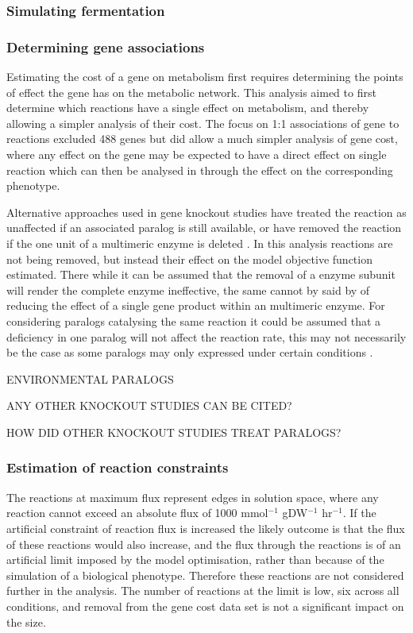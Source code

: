 \subsubsection{Simulating fermentation}

\subsubsection{Determining gene associations}

Estimating the cost of a gene on metabolism first requires determining the points of effect the gene has on the metabolic network. This analysis aimed to first determine which reactions have a single effect on metabolism, and thereby allowing a simpler analysis of their cost. The focus on 1:1 associations of gene to reactions excluded 488 genes but did allow a much simpler analysis of gene cost, where any effect on the gene may be expected to have a direct effect on single reaction which can then be analysed in through the effect on the corresponding phenotype.

Alternative approaches used in gene knockout studies have treated the reaction as unaffected if an associated paralog is still available, or have removed the reaction if the one unit of a multimeric enzyme is deleted \cite{pal2006}. In this analysis reactions are not being removed, but instead their effect on the model objective function estimated. There while it can be assumed that the removal of a enzyme subunit will render the complete enzyme ineffective, the same cannot by said by of reducing the effect of a single gene product within an multimeric enzyme. For considering paralogs catalysing the same reaction it could be assumed that a deficiency in one paralog will not affect the reaction rate, this may not necessarily be the case as some paralogs may only expressed under certain conditions \cite{carlson2007,enviro_paralogs}.

ENVIRONMENTAL PARALOGS

ANY OTHER KNOCKOUT STUDIES CAN BE CITED?

HOW DID OTHER KNOCKOUT STUDIES TREAT PARALOGS?

\subsubsection{Estimation of reaction constraints}

The reactions at maximum flux represent edges in solution space, where any reaction cannot exceed an absolute flux of 1000 mmol$^{-1}$ gDW$^{-1}$ hr$^{-1}$. If the artificial constraint of reaction flux is increased the likely outcome is that the flux of these reactions would also increase, and the flux through the reactions is of an artificial limit imposed by the model optimisation, rather than because of the simulation of a biological phenotype. Therefore these reactions are not considered further in the analysis. The number of reactions at the limit is low, six across all conditions, and removal from the gene cost data set is not a significant impact on the size.

